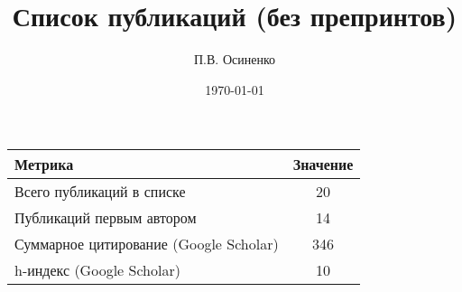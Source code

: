 \documentclass[12pt]{article}
\begin{document}
\title{Список публикаций (без препринтов)}
\author{П.В. Осиненко}
\date{\today}
\maketitle

\begin{center}
\begin{tabular}{l c}
\hline
\textbf{Метрика} & \textbf{Значение} \\
\hline
Всего публикаций в списке & 20 \\
Публикаций первым автором & 14 \\
Суммарное цитирование (Google Scholar) & 346 \\
h-индекс (Google Scholar) & 10 \\
\hline
\end{tabular}
\end{center}
\vspace{1em}
\end{document}
